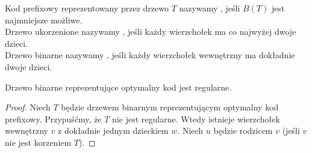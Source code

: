 Kod prefixowy reprezentowany przez drzewo $T$ nazywamy , jeśli $B(T)$ jest najmniejsze możliwe. \\
Drzewo ukorzenione nazywamy , jeśli każdy wierzchołek ma co najwyżej dwoje dzieci. \\
Drzewo binarne nazywamy , jeśli każdy wierzchołek wewnętrzny ma dokładnie dwoje dzieci.

\begin{theorem}
	Drzewo binarne reprezentujące optymalny kod jest regularne.
\end{theorem}

\begin{proof}
	Niech $T$ będzie drzewem binarnym reprezentującym optymalny kod prefixowy. Przypuśćmy, że $T$ nie jest regularne. Wtedy istnieje wierzchołek wewnętrzny $v$ z dokładnie jednym dzieckiem $w$. Niech $u$ będzie rodzicem $v$ (jeśli $v$ nie jest korzeniem $T$).


\end{proof}
